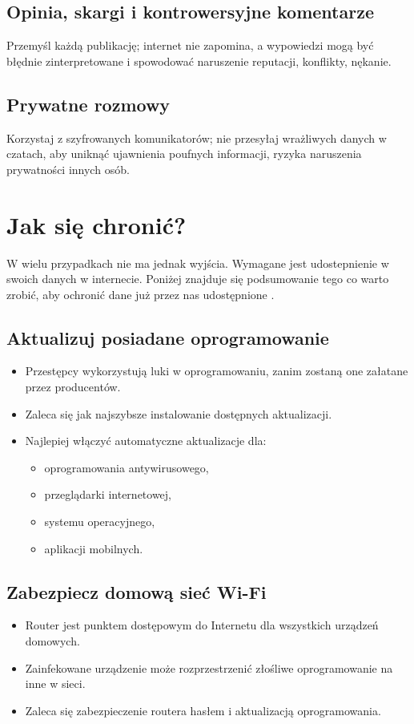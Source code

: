 \subsection{Opinia, skargi i kontrowersyjne komentarze}
Przemyśl każdą publikację; internet nie zapomina, a wypowiedzi mogą być błędnie zinterpretowane i spowodować  naruszenie reputacji, konflikty, nękanie.

\subsection{Prywatne rozmowy}
Korzystaj z szyfrowanych komunikatorów; nie przesyłaj wrażliwych danych w czatach, aby uniknąć ujawnienia poufnych informacji, ryzyka naruszenia prywatności innych osób.

\section{Jak się chronić?}
W wielu przypadkach nie ma jednak wyjścia. Wymagane jest udostepnienie w swoich danych w internecie. Poniżej znajduje się podsumowanie tego co warto zrobić, aby ochronić dane już przez nas udostępnione \cite{PROTECTION}.

\subsection{Aktualizuj posiadane oprogramowanie}
\begin{itemize}
    \item Przestępcy wykorzystują luki w oprogramowaniu, zanim zostaną one załatane przez producentów.
    \item Zaleca się jak najszybsze instalowanie dostępnych aktualizacji.
    \item Najlepiej włączyć automatyczne aktualizacje dla:
    \begin{itemize}
        \item oprogramowania antywirusowego,
        \item przeglądarki internetowej,
        \item systemu operacyjnego,
        \item aplikacji mobilnych.
    \end{itemize}
\end{itemize}

\subsection{Zabezpiecz domową sieć Wi-Fi}
\begin{itemize}
    \item Router jest punktem dostępowym do Internetu dla wszystkich urządzeń domowych.
    \item Zainfekowane urządzenie może rozprzestrzenić złośliwe oprogramowanie na inne w sieci.
    \item Zaleca się zabezpieczenie routera hasłem i aktualizacją oprogramowania.
\end{itemize}

